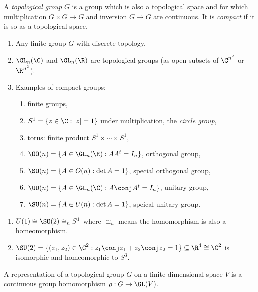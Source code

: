 \documentclass[a4paper]{article}
\theoremstyle{definition}
\begin{document}
\begin{definition}
  A \emph{topological group} \(G\) is a group which is also a topological space and for which multiplication \(G \times G \to G\) and inversion \(G \to G\) are continuous. It is \emph{compact} if it is so as a topological space.
\end{definition}

\begin{eg}\leavevmode
  \begin{enumerate}
  \item Any finite group \(G\) with discrete topology.
  \item \(\GL_n(\C)\) and \(\GL_n(\R)\) are topological groups (as open subsets of \(\C^{n^2}\) or \(\R^{n^2}\)).
  \item Examples of compact groups:
    \begin{enumerate}
    \item finite groups,
    \item \(S^1 = \{z \in \C: |z| = 1\}\) under multiplication, the \emph{circle group},
    \item torus: finite product \(S^1 \times \cdots \times S^1\),
    \item \(\OO(n) = \{A \in \GL_n(\R): AA^t = I_n\}\), orthogonal group,
    \item \(\SO(n) = \{A \in O(n): \det A = 1\}\), special orthogonal group,
    \item \(\UU(n) = \{A \in \GL_n(\C): A \conj A^t = I_n\}\), unitary group,
    \item \(\SU(n) = \{A \in U(n): \det A = 1\}\), speical unitary group.
    \end{enumerate}
  \end{enumerate}
\end{eg}

\begin{remark}\leavevmode
  \begin{enumerate}
  \item \(U(1) \cong \SO(2) \cong_h S^1\) where \(\cong_h\) means the homomorphism is also a homeomorphism.
  \item \(\SU(2) = \{(z_1, z_2) \in \C^2: z_1 \conj z_1 + z_2 \conj z_2 = 1\} \subseteq \R^4 \cong \C^2\) is isomorphic and homeomorphic to \(S^3\).
  \end{enumerate}
\end{remark}

\begin{definition}
  A representation of a topological group \(G\) on a finite-dimensional space \(V\) is a continuous group homomorphism \(\rho: G \to \GL(V)\).
\end{definition}
\end{document}
